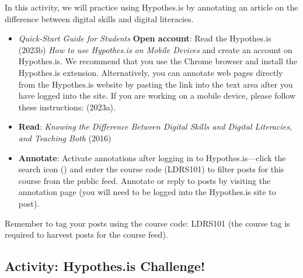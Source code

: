 \documentclass[
  letterpaper,
  DIV=11,
  numbers=noendperiod]{scrreprt}
\begin{document}
\begin{tcolorbox}[enhanced jigsaw, toprule=.15mm, colback=white, colframe=quarto-callout-note-color-frame, bottomtitle=1mm, leftrule=.75mm, coltitle=black, titlerule=0mm, rightrule=.15mm, colbacktitle=quarto-callout-note-color!10!white, left=2mm, title={Learning Activity}, opacitybacktitle=0.6, opacityback=0, breakable, toptitle=1mm, arc=.35mm, bottomrule=.15mm]

In this activity, we will practice using Hypothes.is by annotating an
article on the difference between digital skills and digital literacies.

\begin{itemize}
\item
  \emph{Quick-Start Guide for Students} \textbf{Open account}: Read the
  Hypothes.is (2023b) \emph{How to use Hypothes.is on Mobile Devices}
  and create an account on Hypothes.is. We recommend that you use the
  Chrome browser and install the Hypothes.is extension. Alternatively,
  you can annotate web pages directly from the Hypothes.is website by
  pasting the link into the text area after you have logged into the
  site. If you are working on a mobile device, please follow these
  instructions: (2023a).
\item
  \textbf{Read}: \emph{Knowing the Difference Between Digital Skills and
  Digital Literacies, and Teaching Both} (2016)
\item
  \textbf{Annotate}: Activate annotations after logging in to
  Hypothes.is---click the search icon () and enter the course code
  (LDRS101) to filter posts for this course from the public feed.
  Annotate or reply to posts by visiting the annotation page (you will
  need to be logged into the Hypothes.is site to post).
\end{itemize}

Remember to tag your posts using the course code: LDRS101 (the course
tag is required to harvest posts for the course feed).

\end{tcolorbox}

\subsection{Activity: Hypothes.is
Challenge!}\label{activity-hypothes.is-challenge}
\end{document}
